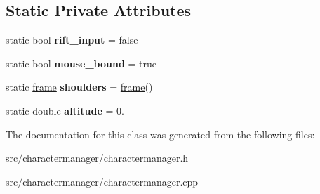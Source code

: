 \subsection*{Static Private Attributes}
\begin{DoxyCompactItemize}
\item 
\hypertarget{class_character_manager_a981ae515bfc7ef2f248c80fb6bd6c345}{}static bool {\bfseries rift\+\_\+input} = false\label{class_character_manager_a981ae515bfc7ef2f248c80fb6bd6c345}

\item 
\hypertarget{class_character_manager_a4fcfeb214b56d98b43f0b131096a5474}{}static bool {\bfseries mouse\+\_\+bound} = true\label{class_character_manager_a4fcfeb214b56d98b43f0b131096a5474}

\item 
\hypertarget{class_character_manager_a6fba3148a02ccf70f45a9b68b35c6b2a}{}static \hyperlink{structframe}{frame} {\bfseries shoulders} = \hyperlink{structframe}{frame}()\label{class_character_manager_a6fba3148a02ccf70f45a9b68b35c6b2a}

\item 
\hypertarget{class_character_manager_a2c2c111818c68bd777cb7f0f85b26e52}{}static double {\bfseries altitude} = 0.\label{class_character_manager_a2c2c111818c68bd777cb7f0f85b26e52}

\end{DoxyCompactItemize}


The documentation for this class was generated from the following files\+:\begin{DoxyCompactItemize}
\item 
src/charactermanager/charactermanager.\+h\item 
src/charactermanager/charactermanager.\+cpp\end{DoxyCompactItemize}
